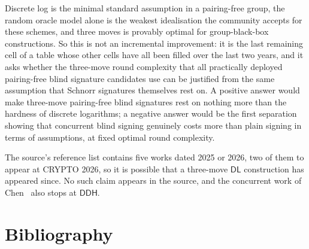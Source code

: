 \documentclass{conjura-conjecture}
\newcommand{\DL}{\mathsf{DL}}
\newcommand{\DDH}{\mathsf{DDH}}
\begin{document}
\begin{remark}\label{rem:consequence}
Discrete log is the minimal standard assumption in a pairing-free group,
the random oracle model alone is the weakest idealisation the community
accepts for these schemes, and three moves is provably optimal for
group-black-box constructions. So this is not an incremental improvement:
it is the last remaining cell of a table whose other cells have all been
filled over the last two years, and it asks whether the three-move round
complexity that all practically deployed pairing-free blind signature
candidates use can be justified from the same assumption that Schnorr
signatures themselves rest on. A positive answer would make three-move
pairing-free blind signatures rest on nothing more than the hardness of
discrete logarithms; a negative answer would be the first separation
showing that concurrent blind signing genuinely costs more than plain
signing in terms of assumptions, at fixed optimal round complexity.
\end{remark}

\begin{remark}\label{rem:fast}
The source's reference list contains five works dated 2025 or 2026, two of
them to appear at CRYPTO 2026, so it is possible that a three-move $\DL$
construction has appeared since. No such claim appears in the source, and
the concurrent work of Chen~\cite{Che26} also stops at $\DDH$.
\end{remark}

\section{Bibliography}
\end{document}

